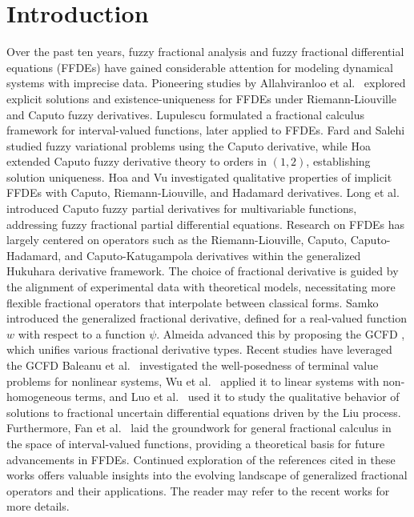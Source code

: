 \documentclass[reqno]{amsart}
\begin{document}
\section{Introduction}

Over the past ten years, fuzzy fractional analysis and fuzzy fractional differential
equations (FFDEs) have gained considerable attention for modeling dynamical systems with
imprecise data. Pioneering studies by Allahviranloo et al.\ \cite{allah2014}
explored explicit solutions and existence-uniqueness for FFDEs under
Riemann-Liouville and Caputo fuzzy derivatives.
Lupulescu \cite{lupu} formulated a fractional calculus framework for interval-valued
functions, later applied to FFDEs. Fard and Salehi \cite{sal} studied fuzzy variational
problems using the Caputo derivative, while Hoa \cite{hoa2020a} extended Caputo fuzzy
derivative theory to orders in $(1,2)$, establishing solution uniqueness.
Hoa and Vu \cite{hoa2019b} investigated qualitative properties of implicit FFDEs
with Caputo, Riemann-Liouville, and Hadamard derivatives. Long et al.\
\cite{long} introduced Caputo fuzzy partial derivatives for multivariable functions,
addressing fuzzy fractional partial differential equations. Research on FFDEs has
largely centered on operators such as the Riemann-Liouville, Caputo, Caputo-Hadamard,
and Caputo-Katugampola derivatives within the generalized Hukuhara derivative framework.
The choice of fractional derivative is guided by the alignment of experimental data
with theoretical models, necessitating more flexible fractional operators that
interpolate between classical forms. Samko \cite{samk} introduced the generalized
fractional derivative, defined for a real-valued function $ w$ with respect
to a function $\psi$. Almeida \cite{alm} advanced this by proposing the GCFD ,
which unifies various fractional derivative types. Recent studies have leveraged the
GCFD Baleanu et al.\ \cite{bal} investigated the well-posedness of terminal value
problems for nonlinear systems, Wu et al.\ \cite{shiri} applied it to linear
systems with non-homogeneous terms, and Luo et al.\ \cite{luo} used it to study
the qualitative behavior of solutions to fractional uncertain differential equations
driven by the Liu process. Furthermore, Fan et al.\ \cite{Fan} laid the groundwork for
general fractional calculus in the space of interval-valued functions, providing a
theoretical basis for future advancements in FFDEs.
Continued exploration of the references cited in these works offers valuable
insights into the evolving landscape of generalized fractional operators and their
applications. The reader may refer to the recent works
\cite{abbas,ahm1,akd,ali1,ali2,ali3,xi} for more details.
\end{document}
